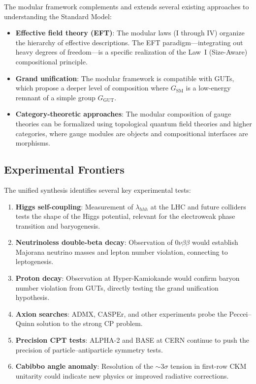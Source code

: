 \documentclass[12pt]{article}
\theoremstyle{definition}
\theoremstyle{remark}
\begin{document}
The modular framework complements and extends several existing approaches to understanding the Standard Model:

\begin{itemize}
\item \textbf{Effective field theory (EFT)}: The modular laws (I through IV) organize the hierarchy of effective descriptions. The EFT paradigm---integrating out heavy degrees of freedom---is a specific realization of the Law~I (Size-Aware) compositional principle.

\item \textbf{Grand unification}: The modular framework is compatible with GUTs, which propose a deeper level of composition where $G_{\mathrm{SM}}$ is a low-energy remnant of a simple group $G_{\mathrm{GUT}}$.

\item \textbf{Category-theoretic approaches}: The modular composition of gauge theories can be formalized using topological quantum field theories and higher categories, where gauge modules are objects and compositional interfaces are morphisms.
\end{itemize}

\subsection{Experimental Frontiers}

The unified synthesis identifies several key experimental tests:

\begin{enumerate}
\item \textbf{Higgs self-coupling}: Measurement of $\lambda_{hhh}$ at the LHC and future colliders tests the shape of the Higgs potential, relevant for the electroweak phase transition and baryogenesis.
\item \textbf{Neutrinoless double-beta decay}: Observation of $0\nu\beta\beta$ would establish Majorana neutrino masses and lepton number violation, connecting to leptogenesis.
\item \textbf{Proton decay}: Observation at Hyper-Kamiokande would confirm baryon number violation from GUTs, directly testing the grand unification hypothesis.
\item \textbf{Axion searches}: ADMX, CASPEr, and other experiments probe the Peccei--Quinn solution to the strong CP problem.
\item \textbf{Precision CPT tests}: ALPHA-2 and BASE at CERN continue to push the precision of particle--antiparticle symmetry tests.
\item \textbf{Cabibbo angle anomaly}: Resolution of the $\sim 3\sigma$ tension in first-row CKM unitarity could indicate new physics or improved radiative corrections.
\end{enumerate}
\end{document}

